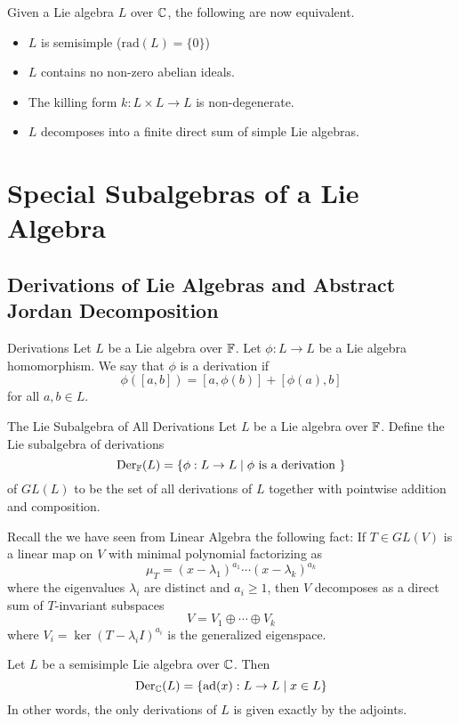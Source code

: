 \documentclass[a4paper]{article}
\begin{document}
Given a Lie algebra $L$ over $\mathbb{C}$, the following are now equivalent. 
\begin{itemize}
\item $L$ is semisimple ($\text{rad}(L)=\{0\}$)
\item $L$ contains no non-zero abelian ideals. 
\item The killing form $k:L\times L\to L$ is non-degenerate. 
\item $L$ decomposes into a finite direct sum of simple Lie algebras. 
\end{itemize}


\pagebreak
\section{Special Subalgebras of a Lie Algebra}
\subsection{Derivations of Lie Algebras and Abstract Jordan Decomposition}
\begin{defn}{Derivations}{} Let $L$ be a Lie algebra over $\mathbb{F}$. Let $\phi:L\to L$ be a Lie algebra homomorphism. We say that $\phi$ is a derivation if $$\phi([a,b])=[a,\phi(b)]+[\phi(a),b]$$ for all $a,b\in L$. 
\end{defn}

\begin{defn}{The Lie Subalgebra of All Derivations}{} Let $L$ be a Lie algebra over $\mathbb{F}$. Define the Lie subalgebra of derivations $$\text{Der}_{\mathbb{F}}(L)=\{\phi:L\to L\;|\;\phi\text{ is a derivation }\}$$ of $GL(L)$ to be the set of all derivations of $L$ together with pointwise addition and composition. 
\end{defn}

Recall the we have seen from Linear Algebra the following fact: If $T\in GL(V)$ is a linear map on $V$ with minimal polynomial factorizing as $$\mu_T=(x-\lambda_1)^{a_1}\cdots(x-\lambda_k)^{a_k}$$ where the eigenvalues $\lambda_i$ are distinct and $a_i\geq 1$, then $V$ decomposes as a direct sum of $T$-invariant subspaces $$V=V_1\oplus\cdots\oplus V_k$$ where $V_i=\ker(T-\lambda_i I)^{a_i}$ is the generalized eigenspace. 

\begin{prp}{}{} Let $L$ be a semisimple Lie algebra over $\mathbb{C}$. Then $$\text{Der}_{\mathbb{C}}(L)=\{\text{ad}(x):L\to L\;|\;x\in L\}$$ In other words, the only derivations of $L$ is given exactly by the adjoints. 
\end{prp}
\end{document}
